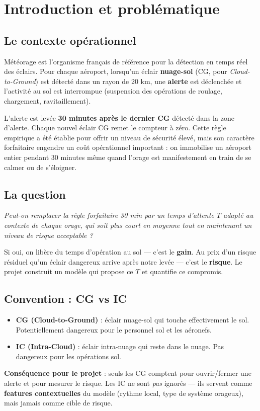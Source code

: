 \documentclass[11pt,a4paper]{article}
\begin{document}
\section{Introduction et problématique}

\subsection{Le contexte opérationnel}

Météorage est l'organisme français de référence pour la détection en temps réel des éclairs.
Pour chaque aéroport, lorsqu'un éclair \textbf{nuage-sol} (CG, pour \textit{Cloud-to-Ground})
est détecté dans un rayon de 20 km, une \textbf{alerte} est déclenchée et l'activité au sol est
interrompue (suspension des opérations de roulage, chargement, ravitaillement).

L'alerte est levée \textbf{30 minutes après le dernier CG} détecté dans la zone d'alerte.
Chaque nouvel éclair CG remet le compteur à zéro. Cette règle empirique a été établie pour
offrir un niveau de sécurité élevé, mais son caractère forfaitaire engendre un coût
opérationnel important : on immobilise un aéroport entier pendant 30 minutes même quand
l'orage est manifestement en train de se calmer ou de s'éloigner.

\subsection{La question}

\textit{Peut-on remplacer la règle forfaitaire 30 min par un temps d'attente $T$ adapté au
contexte de chaque orage, qui soit \emph{plus court} en moyenne tout en maintenant un niveau
de risque acceptable ?}

Si oui, on libère du temps d'opération au sol — c'est le \textbf{gain}. Au prix d'un risque
résiduel qu'un éclair dangereux arrive après notre levée — c'est le \textbf{risque}. Le
projet construit un modèle qui propose ce $T$ et quantifie ce compromis.

\subsection{Convention : CG vs IC}

\begin{tcolorbox}[colback=orange!5,colframe=orange!60!black,title=\textbf{Distinction CG / IC}]
\begin{itemize}[topsep=2pt]
    \item \textbf{CG (Cloud-to-Ground)} : éclair nuage-sol qui touche effectivement le sol.
    Potentiellement dangereux pour le personnel sol et les aéronefs.
    \item \textbf{IC (Intra-Cloud)} : éclair intra-nuage qui reste dans le nuage. Pas
    dangereux pour les opérations sol.
\end{itemize}
\textbf{Conséquence pour le projet} : seuls les CG comptent pour ouvrir/fermer une alerte et
pour mesurer le risque. Les IC ne sont \emph{pas} ignorés — ils servent comme \textbf{features
contextuelles} du modèle (rythme local, type de système orageux), mais jamais comme cible
de risque.
\end{tcolorbox}
\end{document}

